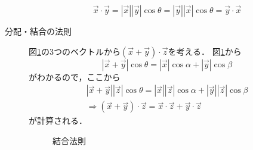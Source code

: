 \begin{description}
        \[
        \vec{x}\cdot\vec{y}=|\vec{x}||\vec{y}|\cos\theta=|\vec{y}||\vec{x}|\cos\theta=\vec{y}\cdot\vec{x}
        \]
        \item[分配・結合の法則] 図\ref{fig:vector_naiseki_ketugo}の3つのベクトルから$(\vec{x}+\vec{y})\cdot\vec{z}$を考える．
        図\ref{fig:vector_naiseki_ketugo}から
        \[
        |\vec{x}+\vec{y}|\cos\theta= |\vec{x}|\cos\alpha +|\vec{y}|\cos\beta
        \]
        がわかるので，ここから
        \begin{eqnarray*}
            &|\vec{x}+\vec{y}||\vec{z}|\cos\theta= |\vec{x}||\vec{z}|\cos\alpha +|\vec{y}||\vec{z}|\cos\beta &\\
            &\Rightarrow (\vec{x}+\vec{y})\cdot\vec{z} =\vec{x}\cdot\vec{z} + \vec{y}\cdot\vec{z} &
        \end{eqnarray*}
        が計算される．
        \begin{figure}[htbp]
            \begin{center}
            \end{center}
            \caption{結合法則}
            \label{fig:vector_naiseki_ketugo}
        \end{figure}

    \end{description}

